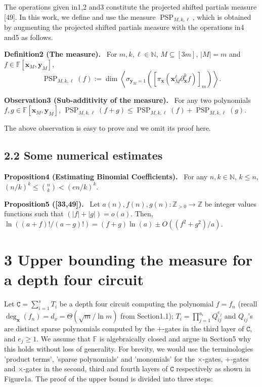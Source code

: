 \documentclass[10pt,a4paper]{article}
\newenvironment{authorclaim}[1]{\par\medskip\noindent\textbf{#1.}\ \ignorespaces}{\par\medskip}
\DeclareMathOperator{\PSP}{PSP}
\begin{document}
The operations given in1,2 and3 constitute the projected shifted partials measure [49]. In this work, we define and use the measure $\PSP_{M,k,\ell}$, which is obtained by augmenting the projected shifted partials measure with the operations in4 and5 as follows.
\begin{authorclaim}{Definition2 (The measure)}
For $m,k,\ell\in\mathbb N$, $M\subseteq[3m]$, $|M|=m$ and $f\in\mathbb F[\mathbf x_M,\mathbf y_M]$,
\[
\PSP_{M,k,\ell}(f):=\dim\left\langle\sigma_{\mathbf y_M=1}\left([\pi_{\mathbf x}(\mathbf x_M^\ell\partial_{\mathbf x}^kf)]_m\right)\right\rangle.
\]
\end{authorclaim}
\begin{authorclaim}{Observation3 (Sub-additivity of the measure)}
For any two polynomials $f,g\in\mathbb F[\mathbf x_M,\mathbf y_M]$, $\PSP_{M,k,\ell}(f+g)\le\PSP_{M,k,\ell}(f)+\PSP_{M,k,\ell}(g)$.
\end{authorclaim}
The above observation is easy to prove and we omit its proof here.
\subsection*{2.2 Some numerical estimates}
\begin{authorclaim}{Proposition4 (Estimating Binomial Coefficients)}
For any $n,k\in\mathbb N$, $k\le n$, $(n/k)^k\le\binom nk<(en/k)^k$.
\end{authorclaim}
\begin{authorclaim}{Proposition5 ([33,49])}
Let $a(n),f(n),g(n):\mathbb Z_{>0}\to\mathbb Z$ be integer values functions such that $(|f|+|g|)=o(a)$. Then, $\ln((a+f)!/(a-g)!)=(f+g)\ln(a)\pm O((f^2+g^2)/a)$.
\end{authorclaim}

\section*{3 Upper bounding the measure for a depth four circuit}
Let $\mathtt C=\sum_{i=1}^sT_i$ be a depth four circuit computing the polynomial $f=f_n$ (recall $\deg_{\mathbf x}(f_n)=d_x=\Theta(\sqrt m/\ln m)$ from Section1.1); $T_i=\prod_{j=1}^{a_i}Q_{ij}^{e_j}$ and $Q_{ij}$'s are distinct sparse polynomials computed by the $+$-gates in the third layer of $\mathtt C$, and $e_j\ge1$. We assume that $\mathbb F$ is algebraically closed and argue in Section5 why this holds without loss of generality. For brevity, we would use the terminologies 'product terms', 'sparse polynomials' and 'monomials' for the $\times$-gates, $+$-gates and $\times$-gates in the second, third and fourth layers of $\mathtt C$ respectively as shown in Figure1a. The proof of the upper bound is divided into three steps:
\end{document}
